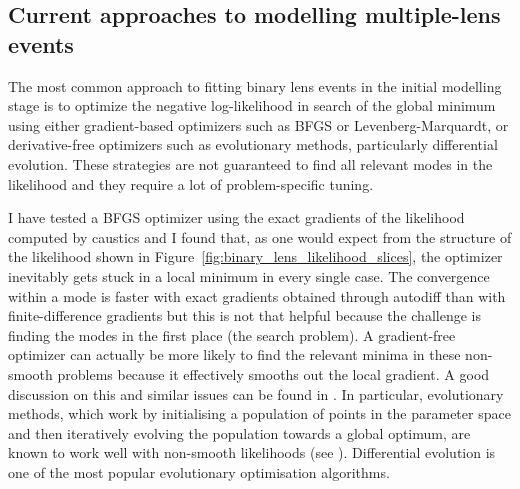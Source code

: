 \documentclass[12pt,dvipsnames]{report}
\newcommand{\ssf}[1]{\textsf{#1}}
\begin{document}
\subsection{Current approaches to modelling multiple-lens events}
The most common approach to fitting binary lens events in the initial modelling stage 
is to optimize the negative log-likelihood in search of the global minimum using 
either gradient-based optimizers such as BFGS or Levenberg-Marquardt, or 
derivative-free optimizers such 
as evolutionary methods, particularly differential evolution. These strategies are 
not guaranteed to find all relevant modes in the likelihood and they require a lot of 
problem-specific tuning. 

I have tested a BFGS optimizer using the exact gradients of the 
likelihood computed by \ssf{caustics} and I found that, as one would expect from the structure 
of the likelihood shown in Figure~\ref{fig:binary_lens_likelihood_slices}, 
the optimizer inevitably gets stuck in a local minimum in every single case.
The convergence within a mode is faster with exact gradients obtained through autodiff 
than with finite-difference gradients but this is not that helpful because the challenge 
is finding the modes in the first place (the search problem).
A gradient-free optimizer can actually be more likely to find the relevant minima in these 
non-smooth problems because it effectively smooths out the local gradient. A good discussion 
on this and similar issues can be found in \citet{2021arXiv211105803M}.
In particular, evolutionary methods, which work by initialising a population of points in the parameter 
space and then iteratively evolving the population towards a global optimum, are known 
to work well with non-smooth likelihoods (see \citep[see][and references therein]{rajpaul2012}). 
Differential evolution is one of the most popular evolutionary optimisation algorithms.
\end{document}
